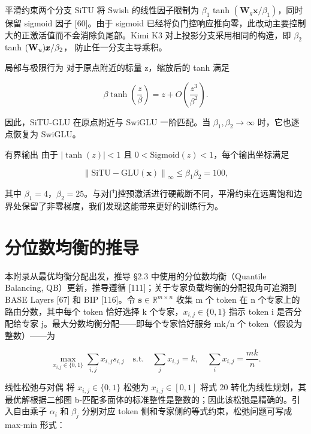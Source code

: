 \documentclass[
  10
]{article}
\begin{document}
平滑约束两个分支 SiTU 将 Swish 的线性因子限制为 \(\beta _ { 1 }\) tanh
\(( \mathbf { W } _ { g } \pmb { x } / \beta _ { 1 } )\)，同时保留 sigmoid 因子 {[}60{]}。由于 sigmoid 已经将负门控响应推向零，此改动主要控制大的正激活值而不会消除负尾部。Kimi K3 对上投影分支采用相同的构造，即 \(\beta _ { 2 }\) tanh
\({ { \left( { \bf { W } } _ { u } \right)} { \pmb x } / \beta _ { 2 }  }\)，
防止任一分支主导乘积。

局部与极限行为 对于原点附近的标量 z，缩放后的 tanh 满足

\[
\beta \tanh \left(\frac {z}{\beta}\right) = z + O \left(\frac {z ^ {3}}{\beta^ {2}}\right).\tag{18}
\]

因此，SiTU-GLU 在原点附近与 SwiGLU 一阶匹配。当 \(\beta _ { 1 } , \beta _ { 2 } \to \infty\) 时，它也逐点恢复为 SwiGLU。

有界输出 由于 \(| \operatorname { t a n h } ( z ) | < 1\) 且 \(0 < \mathrm { S i g m o i d } ( z ) < 1\)，每个输出坐标满足

\[
\left\| \mathrm{SiTU-GLU} (\boldsymbol {x}) \right\| _ {\infty} \leq \beta_ {1} \beta_ {2} = 1 0 0,\tag{19}
\]

其中 \(\beta _ { 1 } = 4\)，\(\beta _ { 2 } = 2 5\)。与对门控预激活进行硬截断不同，平滑约束在远离饱和边界处保留了非零梯度，我们发现这能带来更好的训练行为。

\section{分位数均衡的推导}\label{c-derivation-of-quantile-balancing}

本附录从最优均衡分配出发，推导 §2.3 中使用的分位数均衡（Quantile Balancing, QB）更新，推导遵循 {[}111{]}；关于专家负载均衡的分配视角可追溯到 BASE Layers {[}67{]} 和 BIP {[}116{]}。令 \(\pmb { s } \in \mathbb { R } ^ { m \times n }\) 收集 m 个 token 在 n 个专家上的路由分数，其中每个 token 恰好选择 k 个专家，\(x _ { i , j } \in \{ 0 , 1 \}\) 指示 token i 是否分配给专家 j。最大分数均衡分配——即每个专家恰好服务 mk/n 个 token（假设为整数）——为

\[
\max _ {x _ {i, j} \in \{0, 1 \}} \sum_ {i, j} x _ {i, j} s _ {i, j} \quad \text {s.t.} \quad \sum_ {j} x _ {i, j} = k, \quad \sum_ {i} x _ {i, j} = \frac {m k}{n}.\tag{20}
\]

线性松弛与对偶 将 \(x _ { i , j } \in \{ 0 , 1 \}\) 松弛为 \(x _ { i , j } \in [ 0 , 1 ]\) 将式 20 转化为线性规划，其最优解根据二部图 b-匹配多面体的标准整性是整数的；因此该松弛是精确的。引入自由乘子 \(\alpha _ { i }\) 和 \(\beta _ { j }\) 分别对应 token 侧和专家侧的等式约束，松弛问题可写成 max-min 形式：
\end{document}
